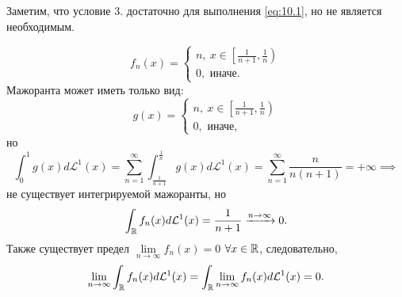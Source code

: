 \begin{remark}
    Заметим, что условие 3. достаточно для выполнения \eqref{eq:10.1}, но не является необходимым.
\end{remark}

\begin{example}
    \[f_n(x) = 
    \begin{cases}
        n, \ x \in \left[\frac{1}{n+1}, \frac{1}{n}\right) \\
        0, \text{ иначе.}
    \end{cases}
    \]
    Мажоранта может иметь только вид:
    \[g(x) = 
    \begin{cases}
        n, \ x \in \left[\frac{1}{n+1}, \frac{1}{n}\right) \\
        0, \text{ иначе,}
    \end{cases}
    \]
    но
    \[\int_{0}^{1}g(x)d \mathcal{L}^1(x)
    = \sum\limits_{n=1}^{\infty} \int_{\frac{1}{n+1}}^{\frac{1}{n}}g(x) d \mathcal{L}^1(x)
    = 
    \sum\limits_{n=1}^{\infty}\frac{n}{n(n+1)} = +\infty \implies\]
    не существует интегрируемой мажоранты, но
    \[\int_{\mathbb{R}}f_n(x) d \mathcal{L}^1(x) = \frac{1}{n+1} \xrightarrow{n\to \infty} 0.\]
    Также существует предел $\lim\limits_{n\to \infty}f_n(x) = 0$ $\forall x \in \mathbb{R}$, следовательно,
    \[\lim\limits_{n\to \infty}\int_{\mathbb{R}} f_n(x) d \mathcal{L}^1(x) = \int_{\mathbb{R}} \lim\limits_{n\to \infty} f_n(x) d \mathcal{L}^1(x) = 0.\]
\end{example}
